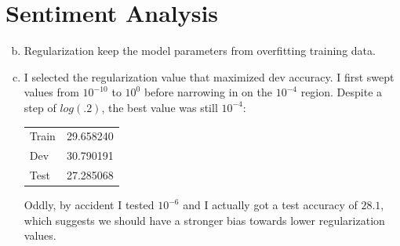\documentclass{article}
\begin{document}
\section{Sentiment Analysis}

\begin{enumerate}[(a)]

\setcounter{enumi}{1}
\item Regularization keep the model parameters from overfitting training data.  

\item I selected the regularization value that maximized dev accuracy.  I first swept values from $10^{-10}$ to $10^{0}$ before narrowing in on the $10^{-4}$ region.  Despite a step of $log(.2)$, the best value was still $10^{-4}$:

\begin{tabular}{| l | l |}
  \hline
  Train & 29.658240 \\
  Dev   & 30.790191 \\
  Test  & 27.285068 \\
  \hline
\end{tabular}

Oddly, by accident I tested $10^{-6}$ and I actually got a test accuracy of $28.1$, which suggests we should have a stronger bias towards lower regularization values.


\end{enumerate}
\end{document}
